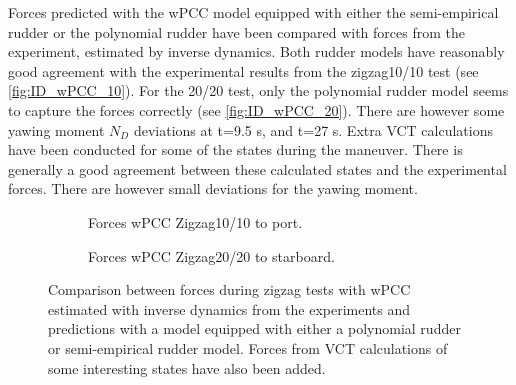 Forces predicted with the wPCC model equipped with either the semi-empirical rudder or the polynomial rudder have been compared with forces from the experiment, estimated by inverse dynamics. Both rudder models have reasonably good agreement with the experimental results from the zigzag10/10 test (see \autoref{fig:ID_wPCC_10}). For the 20/20 test, only the polynomial rudder model seems to capture the forces correctly (see \autoref{fig:ID_wPCC_20}). There are however some yawing moment $N_D$ deviations at t=9.5 s, and t=27 s. Extra VCT calculations have been conducted for some of the states during the maneuver. There is generally a good agreement between these calculated states and the experimental forces. There are however small deviations for the yawing moment.  

\begin{figure}[h]
     \centering
     \begin{subfigure}[b]{\textwidth}
         \centering
         
        \caption{Forces wPCC Zigzag10/10 to port.}
        \label{fig:ID_wPCC_10}
     \end{subfigure}
     \vfill
     \begin{subfigure}[b]{\textwidth}
         
        \caption{Forces wPCC Zigzag20/20 to starboard.}
        \label{fig:ID_wPCC_20}
     \end{subfigure}
        \caption{Comparison between forces during zigzag tests with wPCC estimated with inverse dynamics from the experiments and predictions with a model equipped with either a polynomial rudder or semi-empirical rudder model. Forces from VCT calculations of some interesting states have also been added.}
        \label{fig:ID_wPCC}
\end{figure}